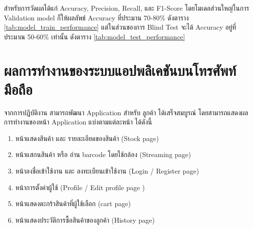 สําหรับการวัดผลได้แก่ Accuracy, Precision, Recall, และ F1-Score
โดยโมเดลส่วนใหญ่ในการ Validation model ก็ให้ผลลัพธ์ Accuracy ที่ประมาน 70-80\%  ดังตาราง \ref{tab:model_train_performance}
แต่ในส่วนของการ Blind Test จะได้ Accuracy อยู่ที่ประมาณ 50-60\% เท่านั้น ดังตาราง \ref{tab:model_test_performance}







\newpage
\section{ผลการทำงานของระบบแอปพลิเคชันบนโทรศัพท์มือถือ}



จากการปฏิบัติงาน สามารถพัฒนา Application สำหรับ ลูกค้า ได้เสร็จสมบูรณ์ โดยสามารถแสดงผลการทำงานของหน้า Application แบ่งตามแต่ละหน้า ได้ดังนี้
\begin{enumerate}
    \item หน้าแสดงสินค้า และ รายละเอียดของสินค้า (Stock page)
    \item หน้าแสกนสินค้า หรือ อ่าน barcode โดยใช้กล้อง (Streaming page)
    \item หน้าลงชื่อเข้าใช้งาน และ ลงทะเบียนเข้าใช้งาน (Login / Register page)
    \item หน้าการตั้งค่าผู้ใช้  (Profile / Edit profile page )
    \item หน้าแสดงตะกร้าสินค้าที่ผู้ใช้เลือก (cart page)
    \item หน้าแสดงประวัติการซื้อสินค้าของลูกค้า (History page)
\end{enumerate}

\newpage


